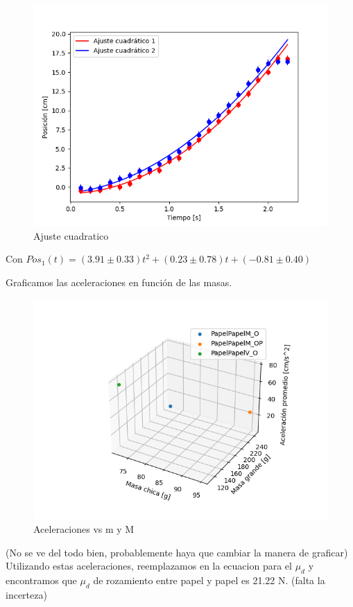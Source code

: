 \documentclass[12pt,a4]{article}
\begin{document}
\begin{figure}[H]
    \centering
    \includegraphics[width=0.9\linewidth]{ajuste2_PapelPapelM_O.png}
    \caption{Ajuste cuadratico}
    \label{fig:a2PPM_O}
\end{figure}

Con $Pos_1(t) = (3.91 \pm 0.33) t^2 + (0.23 \pm 0.78) t + (-0.81 \pm 0.40)$

\newpage
Graficamos las aceleraciones en función de las masas.

\begin{figure}[H]
    \centering
    \includegraphics[width=0.9\linewidth]{scatter_aceleraciones.png}
    \caption{Aceleraciones vs m y M}
    \label{fig:aPPM_O}
\end{figure}

(No se ve del todo bien, probablemente haya que cambiar la manera de graficar) \\

Utilizando estas aceleraciones, reemplazamos en la ecuacion para el $\mu_d$ y encontramos que $\mu_d$ de rozamiento entre papel y papel es 21.22 N. (falta la incerteza)
\end{document}
